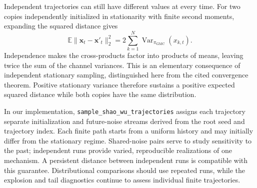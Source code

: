Independent trajectories can still have different values at every time.
For two copies independently initialized in stationarity with finite second
moments, expanding the squared distance gives
\begin{equation}
 \mathbb E\|\mathbf x_t-\mathbf x'_t\|_2^2
 =2\sum_{k=1}^{N}\operatorname{Var}_{\pi_{\mathrm{GMC}}}(x_{k,t}).
 \label{eq:implemented-gmc-independent-distance}
\end{equation}
Independence makes the cross-products factor into products of means, leaving
twice the sum of the channel variances. This is an elementary consequence of
independent stationary sampling, distinguished here from the cited convergence
theorem. Positive stationary variance therefore sustains a positive expected
squared distance while both copies have the same distribution.

In our implementation, \texttt{sample\_shao\_wu\_trajectories} assigns each
trajectory separate initialization and future-noise streams derived from the
root seed and trajectory index. Each finite path starts from a uniform
history and may initially differ from the stationary regime. Shared-noise
pairs serve to study sensitivity to the past; independent runs provide varied,
reproducible realizations of one mechanism. A persistent distance between
independent runs is compatible with this guarantee. Distributional comparisons
should use repeated runs, while the explosion and tail diagnostics continue
to assess individual finite trajectories.
